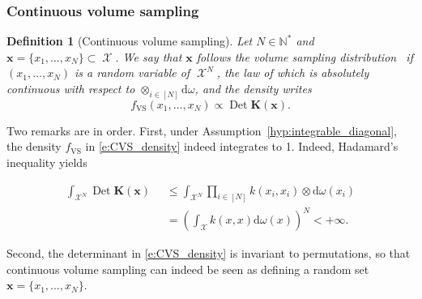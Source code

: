 \documentclass[twoside,11pt]{book}
\newtheorem{definition}{Definition}
\DeclareMathOperator{\Det}{Det}
\DeclareMathOperator{\VS}{\mathrm{VS}}
\DeclareMathOperator{\X}{\mathcal{X}}
\DeclareMathOperator{\MuTen}{\otimes\mathrm{d}\omega(x_{i})}
\begin{document}
\subsubsection{Continuous volume sampling}
\begin{definition}[Continuous volume sampling]\label{def:VS}
Let $N \in \mathbb{N}^{*}$ and $\bm{x} = \{x_{1}, \dots, x_{N}\}\subset \X$. We say that $\bm{x}$ follows the volume sampling distribution
 if $(x_{1}, \dots ,x_{N})$ is a random variable of $\X ^{N}$, the law of which is absolutely continuous with respect to $\otimes_{i \in [N]} \mathrm{d}\omega$, and the density writes
\begin{equation}
  \label{e:CVS_density}
f_{\VS}(x_{1}, \dots ,x_{N}) \propto \Det \bm{K}(\bm{x}).
\end{equation}
\end{definition}

Two remarks are in order. First, under Assumption~\ref{hyp:integrable_diagonal}, the density $f_{\VS}$ in  \eqref{e:CVS_density} indeed integrates to 1. Indeed, Hadamard's inequality yields

\begin{align}
\int_{\X ^{N}} \Det \bm{K}(\bm{x}) \MuTen & \leq \int_{\X ^{N}} \prod\limits_{i \in [N]} k(x_{i},x_{i}) \otimes\mathrm{d}\omega(x_{i}) \nonumber \\
& = \left(\int_{\X}k(x,x) \mathrm{d}\omega(x) \right)^{N}  < +\infty.
\end{align}

Second, the determinant in \eqref{e:CVS_density} is invariant to permutations, so that continuous volume sampling can indeed be seen as defining a random set $\bm{x} = \{x_1,\dots,x_N\}$.
\end{document}
